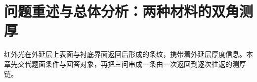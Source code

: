\section{问题重述与总体分析：两种材料的双角测厚}

红外光在外延层上表面与衬底界面返回后形成的条纹，携带着外延层厚度信息。本章先交代题面条件与回答对象，再把三问串成一条由一次返回到逐次往返的测厚链。
